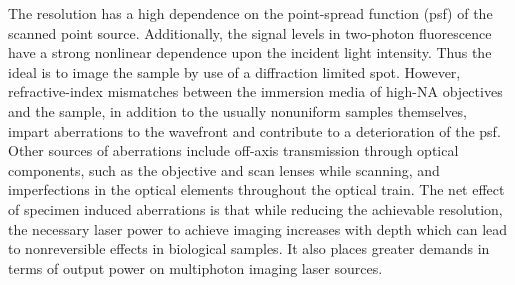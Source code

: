 The resolution has a high dependence on the point-spread function (psf) of the scanned point source. Additionally, the signal levels in two-photon fluorescence have a strong nonlinear dependence upon the incident light intensity. Thus the ideal is to image the sample by use of a diffraction limited spot. However, refractive-index mismatches between the immersion media of high-NA objectives and the sample, in addition to the usually nonuniform samples themselves, impart aberrations to the wavefront and contribute to a deterioration of the psf. Other sources of aberrations include off-axis transmission through optical components, such as the objective and scan lenses while scanning, and imperfections in the optical elements throughout the optical train. The net effect of specimen induced aberrations is that while reducing the achievable resolution, the necessary laser power to achieve imaging increases with depth which can lead to nonreversible effects in biological samples. It also places greater demands in terms of output power on multiphoton imaging laser sources.

